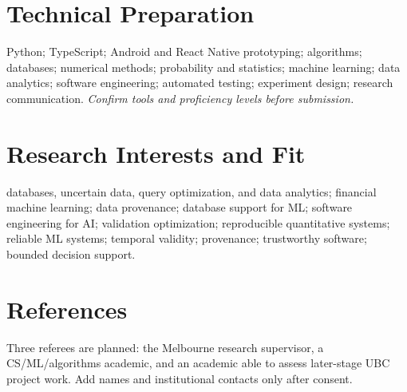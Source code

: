 \documentclass[11pt]{article}
\begin{document}
\section*{Technical Preparation}
Python; TypeScript; Android and React Native prototyping; algorithms; databases; numerical methods; probability and statistics; machine learning; data analytics; software engineering; automated testing; experiment design; research communication. \textit{Confirm tools and proficiency levels before submission.}

\section*{Research Interests and Fit}
databases, uncertain data, query optimization, and data analytics; financial machine learning; data provenance; database support for ML; software engineering for AI; validation optimization; reproducible quantitative systems; reliable ML systems; temporal validity; provenance; trustworthy software; bounded decision support.

\section*{References}
Three referees are planned: the Melbourne research supervisor, a CS/ML/algorithms academic, and an academic able to assess later-stage UBC project work. Add names and institutional contacts only after consent.
\end{document}
